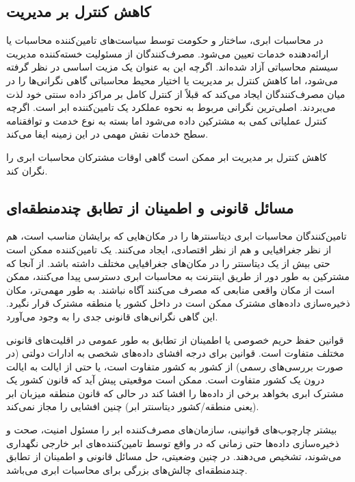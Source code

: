 \documentclass{book}
\begin{document}
    \subsection{کاهش کنترل بر مدیریت}

        در محاسبات ابری، ساختار و حکومت توسط سیاست‌های تامین‌کننده محاسبات یا ارائه‌دهنده خدمات تعیین می‌شود. مصرف‌کنندگان از مسئولیت خسته‌کننده مدیریت سیستم محاسباتی آزاد شده‌اند. اگرچه این به عنوان یک مزیت اساسی در نظر گرفته می‌شود، اما کاهش کنترل بر مدیریت یا اختیار محیط محاسباتی گاهی نگرانی‌ها را در میان مصرف‌کنندگان ایجاد می‌کند که قبلاً از کنترل کامل بر مراکز داده سنتی خود لذت می‌بردند. اصلی‌ترین نگرانی مربوط به نحوه عملکرد یک تامین‌کننده ابر است. اگرچه کنترل عملیاتی کمی به مشترکین داده می‌شود اما بسته به نوع خدمت و توافقنامه سطح خدمات نقش مهمی در این زمینه ایفا می‌کند.

    \begin{addinfo}
        
        کاهش کنترل بر مدیریت ابر ممکن است گاهی اوقات مشترکان محاسبات ابری را نگران کند.
        
    \end{addinfo}

    \subsection{مسائل قانونی و اطمینان از تطابق چندمنطقه‌ای}

        تامین‌کنندگان محاسبات ابری دیتاسنترها را در مکان‌هایی که برایشان مناسب است، هم از نظر جغرافیایی و هم از نظر اقتصادی، ایجاد می‌کنند. یک تامین‌کننده ممکن است حتی بیش از یک دیتاسنتر را در مکان‌های جغرافیایی مختلف داشته باشد. از آنجا که مشترکین به طور دور از طریق اینترنت به محاسبات ابری دسترسی پیدا می‌کنند، ممکن است از مکان واقعی منابعی که مصرف می‌کنند آگاه نباشند. به طور مهمی‌تر، مکان ذخیره‌سازی داده‌های مشترک ممکن است در داخل کشور یا منطقه مشترک قرار نگیرد. این گاهی نگرانی‌های قانونی جدی را به وجود می‌آورد.

        قوانین حفظ حریم خصوصی یا اطمینان از تطابق به طور عمومی در اقلیت‌های قانونی مختلف متفاوت است. قوانین برای درجه افشای داده‌های شخصی به ادارات دولتی (در صورت بررسی‌های رسمی) از کشور به کشور متفاوت است، یا حتی از ایالت به ایالت درون یک کشور متفاوت است. ممکن است موقعیتی پیش آید که قانون کشور یک مشترک ابری بخواهد برخی از داده‌ها را افشا کند در حالی که قانون منطقه میزبان ابر (یعنی منطقه/کشور دیتاسنتر ابر) چنین افشایی را مجاز نمی‌کند.

        بیشتر چارچوب‌های قوانینی، سازمان‌های مصرف‌کننده ابر را مسئول امنیت، صحت و ذخیره‌سازی داده‌ها حتی زمانی که در واقع توسط تامین‌کننده‌های ابر خارجی نگهداری می‌شوند، تشخیص می‌دهند. در چنین وضعیتی، حل مسائل قانونی و اطمینان از تطابق چندمنطقه‌ای چالش‌های بزرگی برای محاسبات ابری می‌باشد.
    
\end{document}
